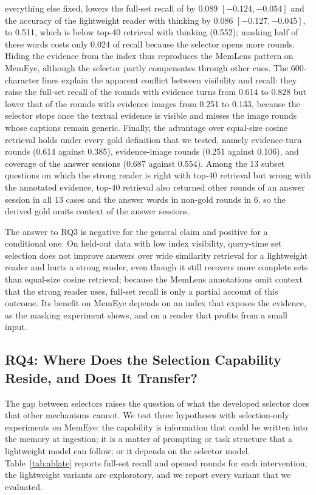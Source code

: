 everything else fixed, lowers the full-set recall of \qss{} by 0.089 $[-0.124, -0.054]$ and the accuracy of the lightweight reader with thinking by 0.086 $[-0.127, -0.045]$, to 0.511, which is below top-40 retrieval with thinking (0.552); masking half of these words costs only 0.024 of recall because the selector opens more rounds. Hiding the evidence from the index thus reproduces the MemLens pattern on MemEye, although the selector partly compensates through other cues. The 600-character lines explain the apparent conflict between visibility and recall: they raise the full-set recall of the rounds with evidence turns from 0.614 to 0.828 but lower that of the rounds with evidence images from 0.251 to 0.133, because the selector stops once the textual evidence is visible and misses the image rounds whose captions remain generic. Finally, the advantage over equal-size cosine retrieval holds under every gold definition that we tested, namely evidence-turn rounds (0.614 against 0.385), evidence-image rounds (0.251 against 0.106), and coverage of the answer sessions (0.687 against 0.554). Among the 13 subset questions on which the strong reader is right with top-40 retrieval but wrong with the annotated evidence, top-40 retrieval also returned other rounds of an answer session in all 13 cases and the answer words in non-gold rounds in 6, so the derived gold omits context of the answer sessions.

The answer to RQ3 is negative for the general claim and positive for a conditional one. On held-out data with low index visibility, query-time set selection does not improve answers over wide similarity retrieval for a lightweight reader and hurts a strong reader, even though it still recovers more complete sets than equal-size cosine retrieval; because the MemLens annotations omit context that the strong reader uses, full-set recall is only a partial account of this outcome. Its benefit on MemEye depends on an index that exposes the evidence, as the masking experiment shows, and on a reader that profits from a small input.

\subsection{RQ4: Where Does the Selection Capability Reside, and Does It Transfer?}
\label{sec:rq4}

The gap between selectors raises the question of what the developed selector does that other mechanisms cannot. We test three hypotheses with selection-only experiments on MemEye: the capability is information that could be written into the memory at ingestion; it is a matter of prompting or task structure that a lightweight model can follow; or it depends on the selector model. Table~\ref{tab:ablate} reports full-set recall and opened rounds for each intervention; the lightweight variants are exploratory, and we report every variant that we evaluated.

